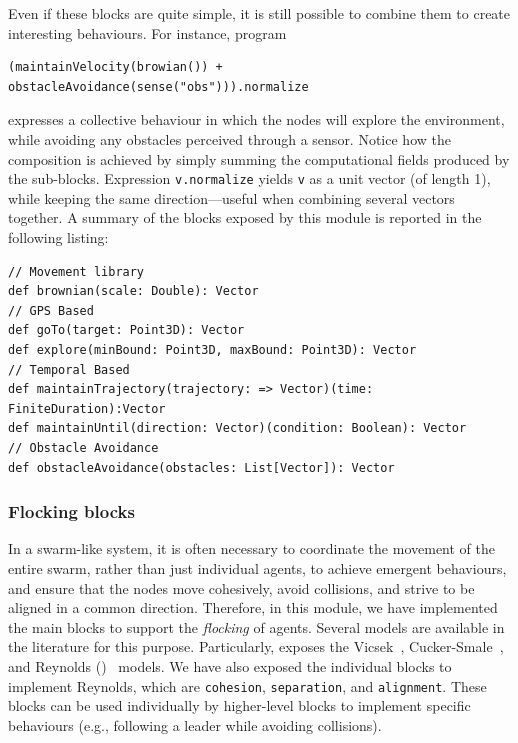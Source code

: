 Even if these blocks are quite simple, 
 it is still possible to combine them to create interesting behaviours. 
For instance, program 
\begin{lstlisting}
(maintainVelocity(browian()) + obstacleAvoidance(sense("obs"))).normalize
\end{lstlisting}
expresses a collective behaviour in which the nodes will explore the environment,
 while avoiding any obstacles perceived through a sensor. 
Notice how the composition is achieved by simply summing the computational fields produced by the sub-blocks.
%
Expression \lstinline|v.normalize| yields \lstinline|v| as a unit vector (of length 1), while keeping the same direction---useful when combining several vectors together.
%
A summary of the blocks exposed by this module is reported in the following listing:
\begin{lstlisting}
// Movement library
def brownian(scale: Double): Vector
// GPS Based
def goTo(target: Point3D): Vector
def explore(minBound: Point3D, maxBound: Point3D): Vector
// Temporal Based
def maintainTrajectory(trajectory: => Vector)(time: FiniteDuration):Vector
def maintainUntil(direction: Vector)(condition: Boolean): Vector
// Obstacle Avoidance
def obstacleAvoidance(obstacles: List[Vector]): Vector
\end{lstlisting}

\subsubsection{Flocking blocks}\label{coordination2023-macro:subsec:flockig} 
In a swarm-like system, 
 it is often necessary to coordinate the movement of the entire swarm, 
 rather than just individual agents, to achieve emergent behaviours,
 and ensure that the nodes move cohesively, avoid collisions, 
 and strive to be aligned in a common direction. 
% 
Therefore, in this module, 
 we have implemented the main blocks to support the \emph{flocking} of agents. 
% 
Several models are available in the literature for this purpose.
 Particularly, \MacroSwarm{} exposes 
 the Vicsek~\cite{VicsekModeling1995}, 
 Cucker-Smale~\cite{CuckerSmaleModeling2007}, 
 and Reynolds ()~\cite{DBLP:conf/siggraph/Reynolds87} models. 
% 
% 
We have also exposed the individual blocks to implement Reynolds, 
 which are \lstinline|cohesion|, \lstinline|separation|, and \lstinline|alignment|. 
% 
These blocks can be used individually by higher-level blocks to implement specific behaviours 
 (e.g., following a leader while avoiding collisions). 

